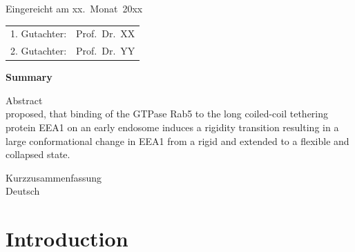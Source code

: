 \documentclass[
    paper=A4,pagesize=automedia,fontsize=12pt,
    BCOR=15mm,DIV=22,
    twoside,headinclude,footinclude=false,
    fleqn,             %
    bibliography=totocnumbered,          %
    listof=totoc,                %
    listof=flat,                 %
    cleardoublepage=empty      %
    numbers=endperiod
]{scrartcl}
\begin{document}
\thispagestyle{empty}\vspace*{48em}

Eingereicht am xx.~Monat~20xx\vspace{1.5em}
\par{\large\begin{tabular}{ll}
        1. Gutachter: & Prof.~Dr.~XX \\
        2. Gutachter: & Prof.~Dr.~YY \\
    \end{tabular}}


\newpage
\begin{center}\large\bfseries Summary\end{center}


Abstract \\
\cite{Singh:2022} proposed, that binding of the GTPase Rab5 to the
long coiled-coil tethering protein EEA1 on an early endosome
induces a rigidity transition resulting in a large conformational
change in EEA1 from a rigid and extended to a flexible and collapsed state.


\vspace{20em}
Kurzzusammenfassung \\
Deutsch \\



\cleardoublepage

\thispagestyle{empty}
\tableofcontents

\cleardoublepage



\section{Introduction}
\end{document}
